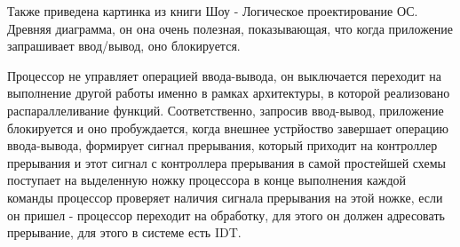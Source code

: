 \documentclass[12pt,a4paper]{scrreprt}
\begin{document}
Также приведена картинка из книги Шоу - Логическое проектирование ОС. Древняя диаграмма, он она очень полезная, показывающая, что когда приложение запрашивает ввод/вывод, оно блокируется.

\begin{figure}[!h]
\end{figure}

\begin{figure}[!h]
\end{figure}

Процессор не управляет операцией ввода-вывода, он выключается переходит на выполнение другой работы именно в рамках архитектуры, в которой реализовано распараллеливание функций. Соответственно, запросив ввод-вывод, приложение блокируется и оно пробуждается, когда внешнее устрйоство завершает операцию ввода-вывода, формирует сигнал прерывания, который приходит на контроллер прерывания и этот сигнал с контроллера прерывания в самой простейшей схемы поступает на выделенную ножку процессора в конце выполнения каждой команды процессор проверяет наличия сигнала прерывания на этой ножке, если он пришел - процессор переходит на обработку, для этого он должен адресовать прерывание, для этого в системе есть IDT.
\end{document}
